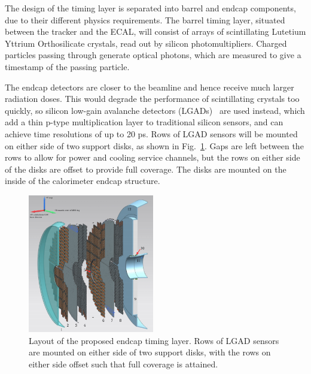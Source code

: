 The design of the timing layer is separated into barrel and endcap components, due to
their different physics requirements. The barrel timing layer, situated between
the tracker and the ECAL, will consist
of arrays of scintillating Lutetium Yttrium Orthosilicate crystals, read out by silicon
photomultipliers. Charged particles passing through generate optical photons, which are
measured to give a timestamp of the passing particle.

The endcap detectors are closer to the beamline and hence receive much larger radiation
doses. This would degrade the performance of scintillating crystals too quickly, so silicon
low-gain avalanche detectors (LGADs)~\cite{Moffat:lgad} are used instead, which add a thin p-type multiplication layer to
traditional silicon sensors, and can achieve time resolutions of up to 20 ps.
Rows of LGAD sensors will be mounted on either side of two support disks, as shown in Fig.~\ref{fig:mtd_etl}.
Gaps are left between the rows to allow for power and cooling service channels, 
but the rows on either side of the disks are offset to provide full coverage.
The disks are mounted on the inside of the calorimeter endcap structure.

\begin{figure}[t]
  \begin{center}
    \includegraphics[width=0.49\textwidth]{figs/cms/etl.png}
    \caption{Layout of the proposed endcap timing layer. Rows of LGAD sensors
      are mounted on either side of two support disks, with the rows on either side
      offset such that full coverage is attained.
            }
    \label{fig:mtd_etl}
  \end{center}
\end{figure}

